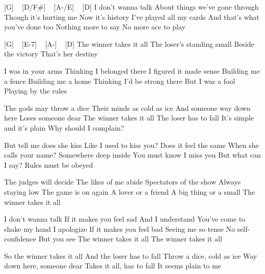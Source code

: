 [G] ~ [D/F#] ~ [A-/E] ~ [D]
I don't wanna talk
About things we've gone through
Though it's hurting me
Now it's history
I've played all my cards
And that's what you've done too
Nothing more to say
No more ace to play

[G] ~ [E-7] ~ [A-] ~ [D]
The winner takes it all
The loser's standing small
Beside the victory
That's her destiny

I was in your arms
Thinking I belonged there
I figured it made sense
Building me a fence
Building me a home
Thinking I'd be strong there
But I was a fool
Playing by the rules

The gods may throw a dice
Their minds as cold as ice
And someone way down here
Loses someone dear
The winner takes it all
The loser has to fall
It's simple and it's plain
Why should I complain?

But tell me does she kiss
Like I used to kiss you?
Does it feel the same
When she calls your name?
Somewhere deep inside
You must know I miss you
But what can I say?
Rules must be obeyed

The judges will decide
The likes of me abide
Spectators of the show
Always staying low
The game is on again
A lover or a friend
A big thing or a small
The winner takes it all

I don't wanna talk
If it makes you feel sad
And I understand
You've come to shake my hand
I apologize
If it makes you feel bad
Seeing me so tense
No self-confidence
But you see
The winner takes it all
The winner takes it all

So the winner takes it all
And the loser has to fall
Throw a dice, cold as ice
Way down here, someone dear
Takes it all, has to fall
It seems plain to me 